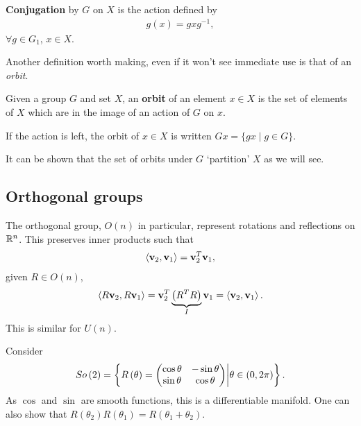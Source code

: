 \begin{definition}
    \textbf{Conjugation} by $G$ on $X$ is the action defined by
    \begin{align}
        g \left( x \right) = g x g^{-1}
    ,\end{align}
    $\forall g \in G_1$, $x \in X$.
\end{definition}

Another definition worth making, even if it won't see immediate use is that of an \textit{orbit}.

\begin{definition}
    Given a group $G$ and set $X$, an \textbf{orbit} of an element $x \in X$ is the set of elements of $X$ which are in the image of an action of $G$ on $x$.
\end{definition}

\begin{example}
    If the action is left, the orbit of $x \in X$ is written $Gx = \{g x  \mid  g \in G\} $.
\end{example}

It can be shown that the set of orbits under $G$ `partition' $X$ as we will see.

\subsection{Orthogonal groups}

The orthogonal group, $O\left( n \right) $ in particular, represent rotations and reflections on $\mathbb{R}^{n}$. This preserves inner products such that
\begin{align}
    \left<\vb{v}_2, \vb{v}_1 \right> = \vb{v}_2^{T} \vb{v}_1
,\end{align}
given $R \in O \left( n \right) $,
\begin{align}
    \left< R \vb{v}_2, R\vb{v}_1 \right> = \vb{v}_2^{T} \underbrace{\left( R^{T} R \right) }_{I} \vb{v}_1 = \left<\vb{v}_2 , \vb{v}_1 \right>
.\end{align}
This is similar for $U\left( n \right) $.

Consider
\begin{align}
    So\left( 2 \right) = \left\{ R\left( \theta \right) = \mqty( \cos \theta & -\sin \theta \\ \sin \theta & \cos \theta) \bigg| \theta \in \left( 0, 2\pi \right)  \right\}  
.\end{align}
As $\cos$ and $\sin$ are smooth functions, this is a differentiable manifold. One can also show that $R \left( \theta_2 \right) R \left( \theta_1 \right) = R \left( \theta_1 + \theta_2 \right) $.

